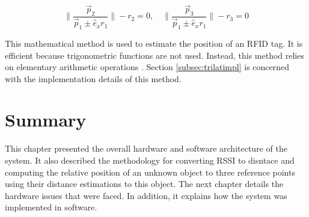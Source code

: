 \[ \| \frac{\vec p_2}{\vec p_1 \pm \hat e_x r_1} \| - r_2 = 0, \quad \| \frac{\vec p_3}{\vec p_1 \pm \hat e_x r_1} \| - r_3 = 0 \]

This mathematical method is used to estimate the position of an RFID tag. It is efficient because trigonometric functions are not used. Instead, this method relies on elementary arithmetic operations \cite{Manolakis1996}. Section \ref{subsec:trilatimpl} is concerned with the implementation details of this method.

\section{Summary}

This chapter presented the overall hardware and software architecture of the system. It also described the methodology for converting RSSI to disntace and computing the relative position of an unknown object to three reference points using their distance estimations to this object. The next chapter details the hardware issues that were faced. In addition, it explains how the system was implemented in software.

